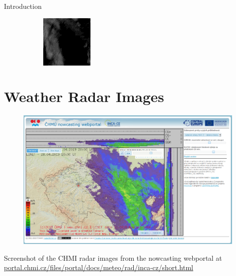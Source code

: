 \documentclass{beamer}
\begin{document}
\begin{frame}{Introduction}
\begin{figure}
\begin{subfigure}{.3\textwidth}
	    \end{subfigure}
	    \begin{subfigure}{.3\textwidth}
	        \centering
	        \includegraphics[width=\linewidth]{fig/radarcs1801030550.png}
	    \end{subfigure}
	\end{figure}
\end{frame}

\section{Weather Radar Images}

\begin{frame}{}
	\begin{figure}
		\centering
		\includegraphics[width=\linewidth]{fig/01_czrad_portal.png}
	\end{figure}

	\footnotesize Screenshot of the CHMI radar images from the nowcasting webportal at\\ \url{portal.chmi.cz/files/portal/docs/meteo/rad/inca-cz/short.html}
	\normalsize
\end{frame}
\end{document}
